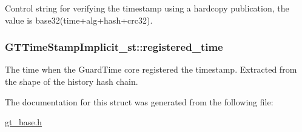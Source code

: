 \label{struct_g_t_time_stamp_implicit__st_a06dd47a8c94b77efe8136e81f1ca5674}
Control string for verifying the timestamp using a hardcopy publication, the value is base32(time+alg+hash+crc32). \hypertarget{struct_g_t_time_stamp_implicit__st_aeef9c4e75ef9a4c3c679ecfe47568957}{
\subsubsection[{registered\_\-time}]{ {\bf GTTimeStampImplicit\_\-st::registered\_\-time}}}
\label{struct_g_t_time_stamp_implicit__st_aeef9c4e75ef9a4c3c679ecfe47568957}
The time when the GuardTime core registered the timestamp. Extracted from the shape of the history hash chain. 

The documentation for this struct was generated from the following file:\begin{DoxyCompactItemize}
\item 
\hyperlink{gt__base_8h}{gt\_\-base.h}\end{DoxyCompactItemize}
